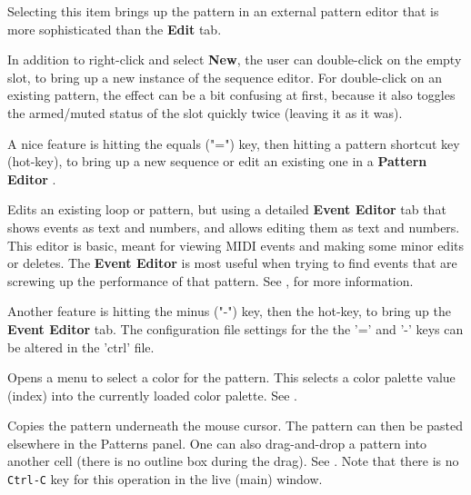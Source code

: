    Selecting this item brings up the pattern in an external pattern editor that
   is more sophisticated than the \textbf{Edit} tab.

   In addition to right-click and select \textbf{New}, the user can
   double-click on the empty slot, to bring up a new instance of the sequence
   editor.  For double-click on an existing pattern,
   the effect can be a bit confusing at first,
   because it also toggles the armed/muted status of the slot
   quickly twice (leaving it as it was).


   A nice feature is hitting the equals ("=") key, then hitting
   a pattern shortcut key (hot-key), to bring up a new sequence or edit an
   existing one in a \textbf{Pattern Editor} .

   Edits an existing loop or pattern, but using a detailed \textbf{Event Editor}
   tab that shows events as text and numbers, and allows editing them as text and
   numbers.
   This editor is basic, meant for viewing
   MIDI events and making some minor edits or deletes.
   The \textbf{Event Editor} is most useful when trying to find events
   that are screwing up the performance of that pattern.
   See , for more information.

   Another feature is hitting the minus
   ("-") key, then the hot-key, to bring up the \textbf{Event Editor} tab.
   The configuration file settings for the the '=' and
   '-' keys can be altered in the 'ctrl' file.

   Opens a menu to select a color for the pattern.  This selects a color
   palette value (index) into the currently loaded color palette.
   See .

   Copies the pattern underneath the mouse cursor.
   The pattern can then be pasted elsewhere in the Patterns panel.
   One can also drag-and-drop a pattern into another cell (there is no outline
   box during the drag).
   See .
   Note that there is no \texttt{Ctrl-C} key for this operation in the
   live (main) window.


